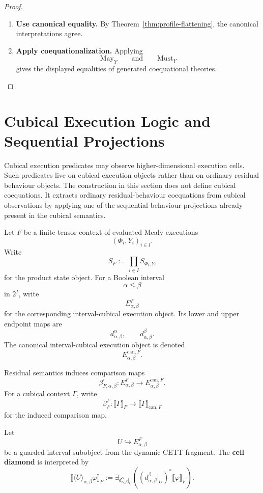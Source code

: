 \begin{proof}
\leavevmode
\begin{enumerate}
  \item \textbf{Use canonical equality.}
  By Theorem~\ref{thm:profile-flattening}, the canonical interpretations
  agree.

  \item \textbf{Apply coequationalization.}
  Applying
  \[
    \mathrm{May}_Y
    \qquad
    \text{and}
    \qquad
    \mathrm{Must}_Y
  \]
  gives the displayed equalities of generated coequational theories.
\end{enumerate}
\end{proof}

\section{Cubical Execution Logic and Sequential Projections}
\label{sec:cubical-execution-logic-formal}

Cubical execution predicates may observe higher-dimensional execution cells.
Such predicates live on cubical execution objects rather than on ordinary
residual behaviour objects.  The construction in this section does not define
cubical coequations.  It extracts ordinary residual-behaviour coequations
from cubical observations by applying one of the sequential behaviour
projections already present in the cubical semantics.

Let \(F\) be a finite tensor context of evaluated Mealy executions
\[
  (\Phi_i,Y_i)_{i\in I}.
\]
Write
\[
  S_F:=\prod_{i\in I}S_{\Phi_i,Y_i}
\]
for the product state object.  For a Boolean interval
\[
  \alpha\leq\beta
\]
in \(2^I\), write
\[
  E^F_{\alpha,\beta}
\]
for the corresponding interval-cubical execution object.  Its lower and upper
endpoint maps are
\[
  d^\alpha_{\alpha,\beta},
  \qquad
  d^\beta_{\alpha,\beta}.
\]
The canonical interval-cubical execution object is denoted
\[
  E^{\mathrm{can},F}_{\alpha,\beta}.
\]

Residual semantics induces comparison maps
\[
  \beta^\square_{F,\alpha,\beta}:
  E^F_{\alpha,\beta}
  \longrightarrow
  E^{\mathrm{can},F}_{\alpha,\beta}.
\]
For a cubical context \(\Gamma\), write
\[
  \beta^\Gamma_F:
  \llbracket\Gamma\rrbracket_F
  \longrightarrow
  \llbracket\Gamma\rrbracket_{\mathrm{can},F}
\]
for the induced comparison map.

\begin{definition}
\label{def:cell-diamond}
Let
\[
  U\hookrightarrow E^F_{\alpha,\beta}
\]
be a guarded interval subobject from the dynamic-CETT fragment.  The
\textbf{cell diamond} is interpreted by
\[
  \llbracket
    \langle U\rangle_{\alpha,\beta}\varphi
  \rrbracket_F
  :=
  \exists_{d^\alpha_{\alpha,\beta}|_U}
  \left(
    (d^\beta_{\alpha,\beta}|_U)^*
    \llbracket\varphi\rrbracket_F
  \right).
\]
\end{definition}

